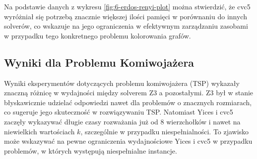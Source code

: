 Na podstawie danych z wykresu \ref{fig:6-erdos-renyi-plot} można stwierdzić, że cvc5 wyróżniał się potrzebą znacznie większej ilości pamięci w porównaniu do innych solverów, co wskazuje na jego ograniczenia w efektywnym zarządzaniu zasobami w przypadku tego konkretnego problemu kolorowania grafów.

\subsection{Wyniki dla Problemu Komiwojażera}

Wyniki eksperymentów dotyczących problemu komiwojażera (TSP) wykazały znaczną różnicę w wydajności między solverem Z3 a pozostałymi. Z3 był w stanie błyskawicznie udzielać odpowiedzi nawet dla problemów o znacznych rozmiarach, co sugeruje jego skuteczność w rozwiązywaniu TSP. Natomiast Yices i cvc5 zaczęły wykazywać długie czasy rozważania już od 8 wierzchołków i nawet na niewielkich wartościach $k$, szczególnie w przypadku niespełnialności. To zjawisko może wskazywać na pewne ograniczenia wydajnościowe Yices i cvc5 w przypadku problemów, w których występują niespełnialne instancje.

